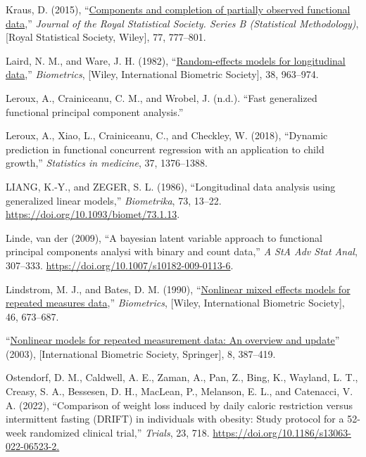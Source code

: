 \documentclass[
  11pt,
]{article}
\newlength{\cslhangindent}
\newlength{\cslentryspacingunit} %
\newenvironment{CSLReferences}[2] %
 {%
  \setlength{\parindent}{0pt}
  \ifodd #1
  \let\oldpar\par
  \def\par{\hangindent=\cslhangindent\oldpar}
  \fi
  \setlength{\parskip}{#2\cslentryspacingunit}
 }%
 {}
\begin{document}
\begin{CSLReferences}{1}{0}
\leavevmode{}%
Kraus, D. (2015),
{``\href{http://www.jstor.org/stable/24775309}{Components and completion
of partially observed functional data},''} \emph{Journal of the Royal
Statistical Society. Series B (Statistical Methodology)}, {[}Royal
Statistical Society, Wiley{]}, 77, 777--801.

\leavevmode{}%
Laird, N. M., and Ware, J. H. (1982),
{``\href{http://www.jstor.org/stable/2529876}{Random-effects models for
longitudinal data},''} \emph{Biometrics}, {[}Wiley, International
Biometric Society{]}, 38, 963--974.

\leavevmode{}%
Leroux, A., Crainiceanu, C. M., and Wrobel, J. (n.d.). {``Fast
generalized functional principal component analysis.''}

\leavevmode{}%
Leroux, A., Xiao, L., Crainiceanu, C., and Checkley, W. (2018),
{``Dynamic prediction in functional concurrent regression with an
application to child growth,''} \emph{Statistics in medicine}, 37,
1376--1388.

\leavevmode{}%
LIANG, K.-Y., and ZEGER, S. L. (1986), {``Longitudinal data analysis
using generalized linear models,''} \emph{Biometrika}, 73, 13--22.
\url{https://doi.org/10.1093/biomet/73.1.13}.

\leavevmode{}%
Linde, van der (2009), {``A bayesian latent variable approach to
functional principal components analysi with binary and count data,''}
\emph{A StA Adv Stat Anal}, 307--333.
\url{https://doi.org/10.1007/s10182-009-0113-6}.

\leavevmode{}%
Lindstrom, M. J., and Bates, D. M. (1990),
{``\href{http://www.jstor.org/stable/2532087}{Nonlinear mixed effects
models for repeated measures data},''} \emph{Biometrics}, {[}Wiley,
International Biometric Society{]}, 46, 673--687.

\leavevmode{}%
{``\href{http://www.jstor.org/stable/1400665}{Nonlinear models for
repeated measurement data: An overview and update}''} (2003),
{[}International Biometric Society, Springer{]}, 8, 387--419.

\leavevmode{}%
Ostendorf, D. M., Caldwell, A. E., Zaman, A., Pan, Z., Bing, K.,
Wayland, L. T., Creasy, S. A., Bessesen, D. H., MacLean, P., Melanson,
E. L., and Catenacci, V. A. (2022), {``Comparison of weight loss induced
by daily caloric restriction versus intermittent fasting (DRIFT) in
individuals with obesity: Study protocol for a 52-week randomized
clinical trial,''} \emph{Trials}, 23, 718.
\url{https://doi.org/10.1186/s13063-022-06523-2.}


\end{CSLReferences}
\end{document}
